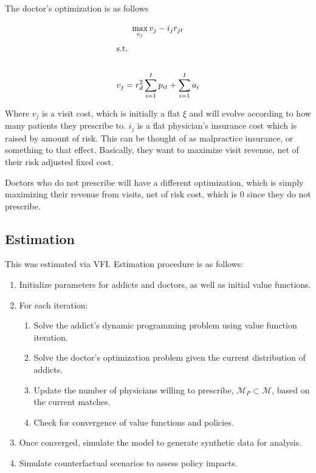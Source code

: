 \documentclass[11pt,a4paper]{article}
\begin{document}
The doctor's optimization is as follows

\begin{equation}
  \max\limits_{v_{j}} v_j - i_jr_{jt} \\
\end{equation}
\begin{gather*}
  \shortintertext{s.t.} \\
  v_j = r_d^2\sum\limits_{i=1}^{I} p_{it} + \sum\limits_{i=1}^Ia_i \\
\end{gather*}

Where $v_{j}$ is a visit cost, which is initially a flat $\xi$ and will evolve according to how many patients they prescribe to. $i_j$ is a flat physician's insurance cost which 
is raised by amount of risk. This can be thought of as malpractice insurance, or something to that effect. Basically, they want to maximize visit revenue, net of their 
risk adjusted fixed cost.

Doctors who do not prescribe will have a different optimization, which is simply maximizing their revenue from visits, net of risk cost, which is $0$ since they do not prescribe.

\subsection{Estimation}

This was estimated via VFI. Estimation procedure is as follows:
\begin{enumerate}
  \item Initialize parameters for addicts and doctors, as well as initial value functions.
  \item For each iteration:
  \begin{enumerate}
    \item Solve the addict's dynamic programming problem using value function iteration.
    \item Solve the doctor's optimization problem given the current distribution of addicts.
    \item Update the number of physicians willing to prescribe, $\mathcal{M}_P\subset\mathcal{M}$, based on the current matches.
    \item Check for convergence of value functions and policies.
  \end{enumerate}
  \item Once converged, simulate the model to generate synthetic data for analysis.
  \item Simulate counterfactual scenarios to assess policy impacts.
\end{enumerate}
\end{document}
